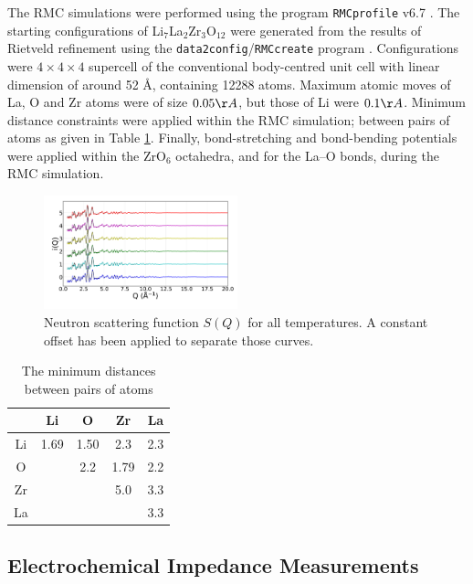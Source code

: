 \documentclass[twoside,twocolumn,9pt]{article}
\begin{document}
The RMC simulations were performed using the program \texttt{RMCprofile} v6.7 \cite{Tucker:2007eh}. The starting configurations of Li$_7$La$_2$Zr$_3$O$_{12}$ were generated from the results of Rietveld refinement using the \texttt{data2config}/\texttt{RMCcreate} program \cite{Dove:2013gk}. Configurations were $4\times 4\times 4$ supercell of the conventional body-centred unit cell with linear dimension of around 52 \AA, containing 12288 atoms. Maximum atomic moves of La, O and Zr atoms were of size $0.05 \AA$, but those of Li were $0.1 \AA$. Minimum distance constraints were applied within the RMC simulation; between  pairs of atoms as given in Table  \ref{tab:min_dis}. Finally, bond-stretching and bond-bending potentials were applied within the ZrO$_6$ octahedra, and for the La--O bonds, during the RMC simulation.

\begin{figure}[t]
\centering
\includegraphics[width=0.5\textwidth]{Pics/nsoq.pdf}
\caption{Neutron scattering function $S(Q)$ for all temperatures. A constant offset has been applied to separate those curves.}
\label{fig:nsoq}
\end{figure}

\begin{table}[t]
\centering
\caption{The minimum distances between pairs of atoms} \label{tab:min_dis}
\begin{tabular}{c|cccc}
\hline
   & Li & O & Zr & La \\
\hline
Li & 1.69 & 1.50 & 2.3 & 2.3 \\
O  &      & 2.2  & 1.79& 2.2 \\
Zr &      &      & 5.0 & 3.3 \\
La &      &      &     & 3.3 \\
\hline
\end{tabular}
\end{table}

\subsection{Electrochemical Impedance Measurements}
\end{document}
